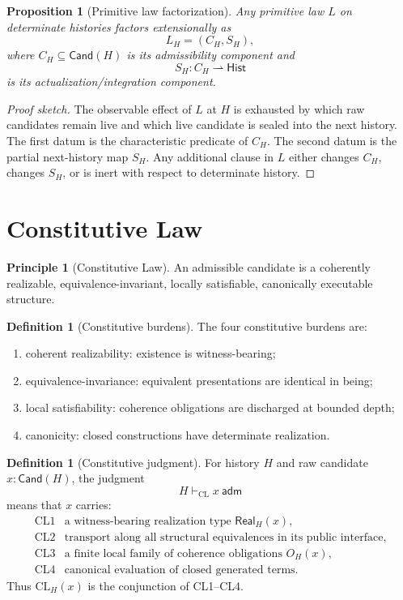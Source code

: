 \documentclass[11pt]{article}
\theoremstyle{plain}
\newtheorem{proposition}[theorem]{Proposition}
\theoremstyle{definition}
\newtheorem{definition}[theorem]{Definition}
\newtheorem{principle}[theorem]{Principle}
\theoremstyle{remark}
\newenvironment{proofsketch}{\begin{proof}[Proof sketch]}{\end{proof}}
\newcommand{\CL}{\mathrm{CL}}
\newcommand{\Hist}{\mathsf{Hist}}
\newcommand{\Cand}{\mathsf{Cand}}
\newcommand{\Real}{\mathsf{Real}}
\begin{document}
\begin{proposition}[Primitive law factorization]
Any primitive law \(L\) on determinate histories factors extensionally as
\[
L_H=(C_H,S_H),
\]
where \(C_H\subseteq\Cand(H)\) is its admissibility component and
\[
S_H:C_H\rightharpoonup \Hist
\]
is its actualization/integration component.
\end{proposition}

\begin{proofsketch}
The observable effect of \(L\) at \(H\) is exhausted by which raw candidates remain live and which live candidate is sealed into the next history. The first datum is the characteristic predicate of \(C_H\). The second datum is the partial next-history map \(S_H\). Any additional clause in \(L\) either changes \(C_H\), changes \(S_H\), or is inert with respect to determinate history.
\end{proofsketch}

\section{Constitutive Law}

\begin{principle}[Constitutive Law]
An admissible candidate is a coherently realizable, equivalence-invariant, locally satisfiable, canonically executable structure.
\end{principle}

\begin{definition}[Constitutive burdens]
The four constitutive burdens are:
\begin{enumerate}[leftmargin=*]
\item coherent realizability: existence is witness-bearing;
\item equivalence-invariance: equivalent presentations are identical in being;
\item local satisfiability: coherence obligations are discharged at bounded depth;
\item canonicity: closed constructions have determinate realization.
\end{enumerate}
\end{definition}

\begin{definition}[Constitutive judgment]
For history \(H\) and raw candidate \(x:\Cand(H)\), the judgment
\[
H\vdash_{\CL} x\ \mathsf{adm}
\]
means that \(x\) carries:
\[
\begin{array}{ll}
\mathrm{CL1} & \text{a witness-bearing realization type } \Real_H(x),\\
\mathrm{CL2} & \text{transport along all structural equivalences in its public interface},\\
\mathrm{CL3} & \text{a finite local family of coherence obligations } O_H(x),\\
\mathrm{CL4} & \text{canonical evaluation of closed generated terms.}
\end{array}
\]
Thus \(\CL_H(x)\) is the conjunction of CL1--CL4.
\end{definition}
\end{document}
